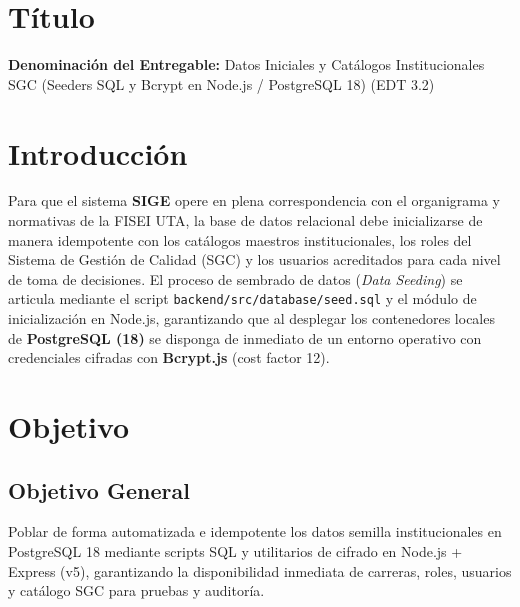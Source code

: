 \documentclass[12pt,a4paper]{article}
\begin{document}

\vspace{0.25cm}
\section{Título}
\textbf{Denominación del Entregable:} Datos Iniciales y Catálogos Institucionales SGC (Seeders SQL y Bcrypt en Node.js / PostgreSQL 18) (EDT 3.2)



\section{Introducción}
Para que el sistema \textbf{SIGE} opere en plena correspondencia con el organigrama y normativas de la FISEI UTA, la base de datos relacional debe inicializarse de manera idempotente con los catálogos maestros institucionales, los roles del Sistema de Gestión de Calidad (SGC) y los usuarios acreditados para cada nivel de toma de decisiones. El proceso de sembrado de datos (\textit{Data Seeding}) se articula mediante el script \texttt{backend/src/database/seed.sql} y el módulo de inicialización en Node.js, garantizando que al desplegar los contenedores locales de \textbf{PostgreSQL (18)} se disponga de inmediato de un entorno operativo con credenciales cifradas con \textbf{Bcrypt.js} (cost factor 12).

\section{Objetivo}

\subsection{Objetivo General}
Poblar de forma automatizada e idempotente los datos semilla institucionales en PostgreSQL 18 mediante scripts SQL y utilitarios de cifrado en Node.js + Express (v5), garantizando la disponibilidad inmediata de carreras, roles, usuarios y catálogo SGC para pruebas y auditoría.
\end{document}
